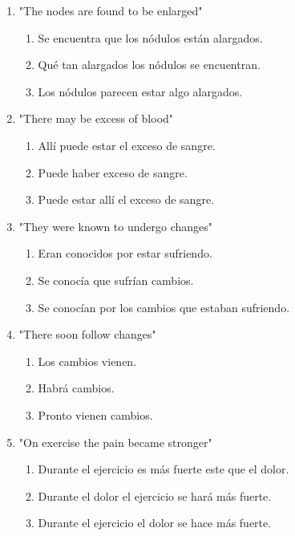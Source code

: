 \documentclass[11pt,a4paper]{article}
\begin{document}
\begin{enumerate}
    \item "The nodes are found to be enlarged"
    \begin{enumerate}[label=\alph*.]
        \item Se encuentra que los nódulos están alargados.
        \item Qué tan alargados los nódulos se encuentran.
        \item Los nódulos parecen estar algo alargados.
    \end{enumerate}

    \item "There may be excess of blood"
    \begin{enumerate}[label=\alph*.]
        \item Allí puede estar el exceso de sangre.
        \item Puede haber exceso de sangre.
        \item Puede estar allí el exceso de sangre.
    \end{enumerate}

    \item "They were known to undergo changes"
    \begin{enumerate}[label=\alph*.]
        \item Eran conocidos por estar sufriendo.
        \item Se conocía que sufrían cambios.
        \item Se conocían por los cambios que estaban sufriendo.
    \end{enumerate}

    \item "There soon follow changes"
    \begin{enumerate}[label=\alph*.]
        \item Los cambios vienen.
        \item Habrá cambios.
        \item Pronto vienen cambios.
    \end{enumerate}

    \item "On exercise the pain became stronger"
    \begin{enumerate}[label=\alph*.]
        \item Durante el ejercicio es más fuerte este que el dolor.
        \item Durante el dolor el ejercicio se hará más fuerte.
        \item Durante el ejercicio el dolor se hace más fuerte.
    \end{enumerate}


\end{enumerate}
\end{document}
